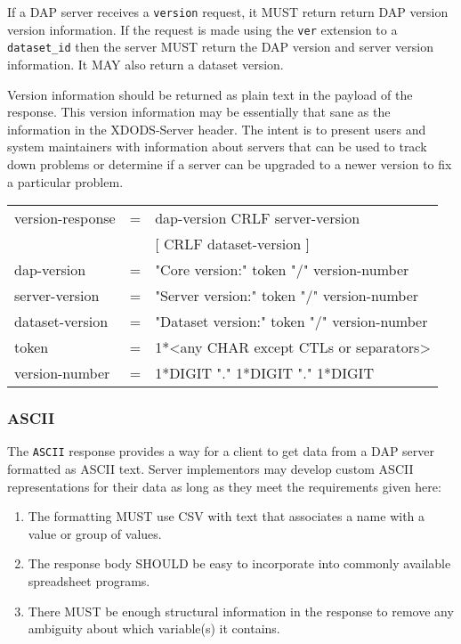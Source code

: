 \documentclass{article}
\begin{document}
If a \ac{DAP} server receives a \texttt{version} request, it MUST return
return \ac{DAP} version version information. If the request is made using the
\texttt{ver} extension to a \texttt{dataset\_id} then the server MUST return
the \ac{DAP} version and server version information. It MAY also return a
dataset version.

Version information should be returned as plain text in the payload of the
response. This version information may be essentially that sane as the
information in the XDODS-Server header. The intent is to present users and
system maintainers with information about servers that can be used to track
down problems or determine if a server can be upgraded to a newer version to
fix a particular problem.

\begin{ttfamily}
\begin{center}
\begin{tabular}{lll}
version-response & = & dap-version CRLF server-version \\
                 & & [ CRLF dataset-version ] \\
dap-version & = & "Core version:" token "/" version-number \\
server-version & = & "Server version:" token "/" version-number \\
dataset-version & = & "Dataset version:" token "/" version-number \\
token & = & 1*<any CHAR except CTLs or separators> \\
version-number & = & 1*DIGIT "." 1*DIGIT "." 1*DIGIT \\
\end{tabular}
\end{center}
\end{ttfamily}

\subsubsection{ASCII}
\label{sec:ascii}
The \texttt{ASCII} response provides a way for a client to get data from a
\ac{DAP} server formatted as ASCII text. Server implementors may develop
custom ASCII representations for their data as long as they meet the
requirements given here:

\begin{enumerate}
\item The formatting MUST use \ac{CSV} with text that associates a name with
  a value or group of values.
\item The response body SHOULD be easy to incorporate into commonly available
  spreadsheet programs.
\item There MUST be enough structural information in the response to remove
  any ambiguity about which variable(s) it contains.
\end{enumerate}
\end{document}
